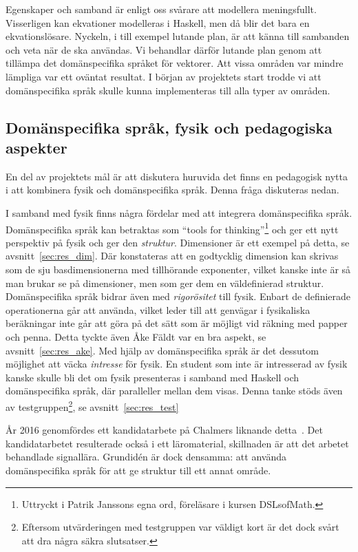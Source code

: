 Egenskaper och samband är enligt oss svårare att modellera meningsfullt. Visserligen kan ekvationer modelleras i Haskell, men då blir det bara en ekvationslösare. Nyckeln, i till exempel lutande plan, är att känna till sambanden och veta när de ska användas. Vi behandlar därför lutande plan genom att tillämpa det domänspecifika språket för vektorer. Att vissa områden var mindre lämpliga var ett oväntat resultat. I början av projektets start trodde vi att domänspecifika språk skulle kunna implementeras till alla typer av områden.

\subsection{Domänspecifika språk, fysik och pedagogiska aspekter}\label{sec:bara_fysik}

En del av projektets mål är att diskutera huruvida det finns en pedagogisk nytta i att kombinera fysik och domänspecifika språk. Denna fråga diskuteras nedan.

I samband med fysik finns några fördelar med att integrera domänspecifika språk. Domänspecifika språk kan betraktas som ``tools for thinking''\footnote{Uttryckt i Patrik Janssons egna ord, föreläsare i kursen DSLsofMath.} och ger ett nytt perspektiv på fysik och ger den \textit{struktur}. Dimensioner är ett exempel på detta, se avsnitt~\ref{sec:res_dim}. Där konstateras att en godtycklig dimension kan skrivas som de sju basdimensionerna med tillhörande exponenter, vilket kanske inte är så man brukar se på dimensioner, men som ger dem en väldefinierad struktur. Domänspecifika språk bidrar även med \textit{rigorösitet} till fysik. Enbart de definierade operationerna går att använda, vilket leder till att genvägar i fysikaliska beräkningar inte går att göra på det sätt som är möjligt vid räkning med papper och penna. Detta tyckte även Åke Fäldt var en bra aspekt, se avsnitt~\ref{sec:res_ake}. Med hjälp av domänspecifika språk är det dessutom möjlighet att väcka \textit{intresse} för fysik. En student som inte är intresserad av fysik kanske skulle bli det om fysik presenteras i samband med Haskell och domänspecifika språk, där paralleller mellan dem visas. Denna tanke stöds även av testgruppen\footnote{Eftersom utvärderingen med testgruppen var väldigt kort är det dock svårt att dra några säkra slutsatser.}, se avsnitt~\ref{sec:res_test}

År 2016 genomfördes ett kandidatarbete på Chalmers liknande
detta~\cite{kandidat2016}. Det kandidatarbetet resulterade också i ett
läromaterial, skillnaden är att det arbetet behandlade signallära. Grundidén är
dock densamma: att använda domänspecifika språk för att ge struktur till ett
annat område.

